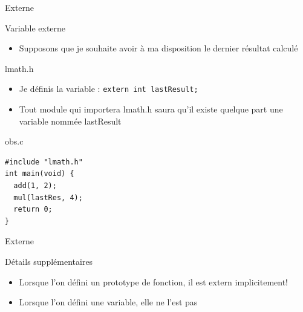 \def\ftitle{Externe}
\begin{frame}[containsverbatim]{\ftitle}
\def\blocktitle{Variable externe}
\begin{block}{\blocktitle}
\begin{itemize}
\item Supposons que je souhaite avoir à ma disposition le dernier résultat calculé
\end{itemize}
\end{block}
\def\blocktitle{lmath.h}
\begin{block}{\blocktitle}
\begin{itemize}
\item Je définis la variable : \verb!extern int lastResult;!
\item Tout module qui importera lmath.h saura qu'il existe quelque part une variable nommée lastResult
\end{itemize}
\end{block}

\def\blocktitle{obs.c}
\begin{block}{\blocktitle}
\begin{verbatim}
#include "lmath.h"
int main(void) {
  add(1, 2);
  mul(lastRes, 4);
  return 0;
}
\end{verbatim}
\end{block}
\end{frame}


\begin{frame}[containsverbatim]{\ftitle}
\def\blocktitle{Détails supplémentaires}
\begin{block}{\blocktitle}
\begin{itemize}
\item Lorsque l'on défini un prototype de fonction, il est extern implicitement!
\item Lorsque l'on défini une variable, elle ne l'est pas
\end{itemize}
\end{block}
\end{frame}



